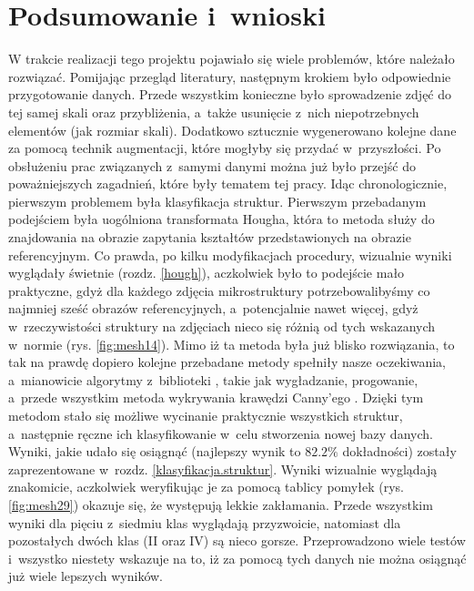 \chapter{Podsumowanie i~wnioski}
\label{podsumowanie.wnioski}

W trakcie realizacji tego projektu pojawiało się wiele problemów, które należało rozwiązać. Pomijając przegląd literatury, następnym krokiem było odpowiednie przygotowanie danych. Przede wszystkim konieczne było sprowadzenie zdjęć do tej samej skali oraz przybliżenia, a~także usunięcie z~nich niepotrzebnych elementów (jak rozmiar skali). Dodatkowo sztucznie wygenerowano kolejne dane za pomocą technik augmentacji, które mogłyby się przydać w~przyszłości. Po obsłużeniu prac związanych z~samymi danymi można już było przejść do poważniejszych zagadnień, które były tematem tej pracy. Idąc chronologicznie, pierwszym problemem była klasyfikacja struktur. Pierwszym przebadanym podejściem była uogólniona transformata Hougha, która to metoda służy do znajdowania na obrazie zapytania kształtów przedstawionych na obrazie referencyjnym. Co prawda, po kilku modyfikacjach procedury, wizualnie wyniki wyglądały świetnie (rozdz. \ref{hough}), aczkolwiek było to podejście mało praktyczne, gdyż dla każdego zdjęcia mikrostruktury potrzebowalibyśmy co najmniej sześć obrazów referencyjnych, a~potencjalnie nawet więcej, gdyż w~rzeczywistości struktury na zdjęciach nieco się różnią od tych wskazanych w~normie (rys. \ref{fig:mesh14}). 
Mimo iż ta metoda była już blisko rozwiązania, to tak na prawdę dopiero kolejne przebadane metody spełniły nasze oczekiwania, a~mianowicie algorytmy z~biblioteki \href{https://opencv.org/}{}, takie jak wygładzanie, progowanie, a~przede wszystkim metoda wykrywania krawędzi Canny'ego \cite{Canny86}. Dzięki tym metodom stało się możliwe wycinanie praktycznie wszystkich struktur, a~następnie ręczne ich klasyfikowanie w~celu stworzenia nowej bazy danych. Wyniki, jakie udało się osiągnąć (najlepszy wynik to $82.2\%$ dokładności) zostały zaprezentowane w~rozdz. \ref{klasyfikacja.struktur}. Wyniki wizualnie wyglądają znakomicie, aczkolwiek weryfikując je za pomocą tablicy pomyłek (rys. \ref{fig:mesh29}) okazuje się, że występują lekkie zakłamania. Przede wszystkim wyniki dla pięciu z~siedmiu klas wyglądają przyzwoicie, natomiast dla pozostałych dwóch klas (II oraz IV) są nieco gorsze. Przeprowadzono wiele testów i~wszystko niestety wskazuje na to, iż za pomocą tych danych nie można osiągnąć już wiele lepszych wyników.

